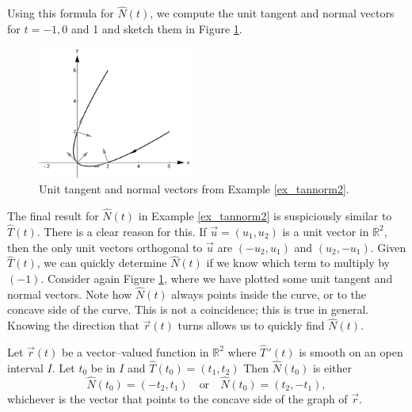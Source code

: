 \begin{example}
\begin{enumerate}
Using this formula for $\widehat N(t)$, we compute the unit tangent and normal vectors for $t=-1,0$ and 1 and sketch them in Figure \ref{fig_vector_fun_12}.

\end{enumerate}

\begin{figure}[H]
	\begin{center}
			\includegraphics[width=0.45\textwidth]{fig_vector_fun_12}
	\caption{Unit tangent and normal vectors from Example \ref{ex_tannorm2}.}
	\label{fig_vector_fun_12}
	\end{center}
\end{figure}


\end{example}

The final 	result for $\widehat N(t)$ in Example \ref{ex_tannorm2} is suspiciously similar to $\widehat T(t)$. There is a clear reason for this. If $\vec u = \left( u_1,u_2\right) $ is a unit vector in $\mathbb{R}^2$, then the only unit vectors orthogonal to $\vec u$ are $\left( -u_2,u_1\right) $ and $\left( u_2,-u_1\right)$. Given $\widehat T(t)$, we can quickly determine $\widehat N(t)$ if we know which term to multiply by $(-1)$.
Consider again Figure \ref{fig_vector_fun_12}, where we have plotted some unit tangent and normal vectors. Note how $\widehat N(t)$ always points inside the curve, or to the concave side of the curve. This is not a coincidence; this is true in general. Knowing the direction that $\vec r(t)$ turns allows us to quickly find $\widehat N(t)$.


\begin{theorem}\label{thm:concave}
Let $\vec r(t)$ be a vector--valued function in $\mathbb{R}^2$ where $\widehat T\,'(t)$ is smooth on an open interval $I$. Let $t_0$ be in $I$ and $\widehat T(t_0) = \left( t_1,t_2\right)$ Then $\widehat N(t_0)$ is either
$$\widehat N(t_0) = \left( -t_2,t_1\right) \quad \text{or}\quad \widehat N(t_0) = \left( t_2,-t_1\right),$$ whichever is the vector that points to the concave side of the graph of $\vec r$.
\end{theorem}


